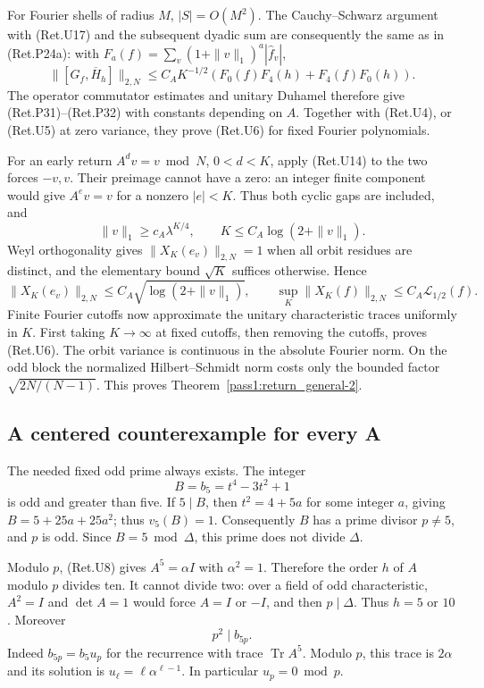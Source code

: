For Fourier shells of radius \(M\), \(|S|=O(M^2)\). The
Cauchy--Schwarz argument with (Ret.U17) and the subsequent dyadic
sum are consequently the same as in (Ret.P24a): with
\(F_a(f)=\sum_v(1+\|v\|_1)^a|\widehat f_v|\),
\[
 \|[G_f,\overline H_h]\|_{2,N}
       \le C_A K^{-1/2}(F_0(f)F_4(h)+F_4(f)F_0(h)).
\]
The operator commutator estimates and unitary Duhamel therefore give
(Ret.P31)--(Ret.P32) with constants depending on \(A\).
Together with (Ret.U4), or (Ret.U5) at zero variance, they prove (Ret.U6)
for fixed Fourier polynomials.

For an early return \(A^dv=v\bmod N\), \(0<d<K\), apply (Ret.U14) to
the two forces \(-v,v\). Their preimage cannot have a zero:
an integer finite component would give \(A^e v=v\) for a nonzero
\(|e|<K\). Thus both cyclic gaps are included, and
\[
        \|v\|_1\ge c_A\lambda^{K/4},\qquad
        K\le C_A\log(2+\|v\|_1).                         \tag{Ret.U18}
\]
Weyl orthogonality gives \(\|X_K(e_v)\|_{2,N}=1\) when all orbit
residues are distinct, and the elementary bound \(\sqrt K\) suffices
otherwise. Hence
\[
 \|X_K(e_v)\|_{2,N}\le C_A\sqrt{\log(2+\|v\|_1)},\qquad
 \sup_K\|X_K(f)\|_{2,N}\le C_A\mathcal L_{1/2}(f).         \tag{Ret.U19}
\]
Finite Fourier cutoffs now approximate the unitary characteristic
traces uniformly in \(K\). First taking \(K\to\infty\) at fixed cutoffs,
then removing the cutoffs, proves (Ret.U6). The orbit variance is
continuous in the absolute Fourier norm. On the odd block the
normalized Hilbert--Schmidt norm costs only the bounded factor
\(\sqrt{2N/(N-1)}\). This proves Theorem~\ref{pass1:return_general-2}.

\hypertarget{a-centered-counterexample-for-every-a}{%
\subsection{A centered counterexample for every A}\label{a-centered-counterexample-for-every-a}}

The needed fixed odd prime always exists. The integer
\[
                 B=b_5=t^4-3t^2+1
\]
is odd and greater than five. If \(5\mid B\), then \(t^2=4+5a\)
for some integer \(a\), giving \(B=5+25a+25a^2\); thus \(v_5(B)=1\).
Consequently \(B\) has a prime divisor \(p\ne5\), and \(p\) is odd.
Since \(B=5\bmod\Delta\), this prime does not divide \(\Delta\).

Modulo \(p\), (Ret.U8) gives \(A^5=\alpha I\) with \(\alpha^2=1\).
Therefore the order \(h\) of \(A\) modulo \(p\) divides ten.
It cannot divide two: over a field of odd characteristic,
\(A^2=I\) and \(\det A=1\) would force \(A=I\) or \(-I\), and then
\(p\mid\Delta\). Thus \(h=5\) or \(10\).
Moreover
\[
                         p^2\mid b_{5p}.                 \tag{Ret.U20}
\]
Indeed \(b_{5p}=b_5u_p\) for the recurrence with trace
\(\operatorname{Tr}A^5\). Modulo \(p\), this trace is \(2\alpha\)
and its solution is \(u_\ell=\ell\alpha^{\ell-1}\).
In particular \(u_p=0\bmod p\).

